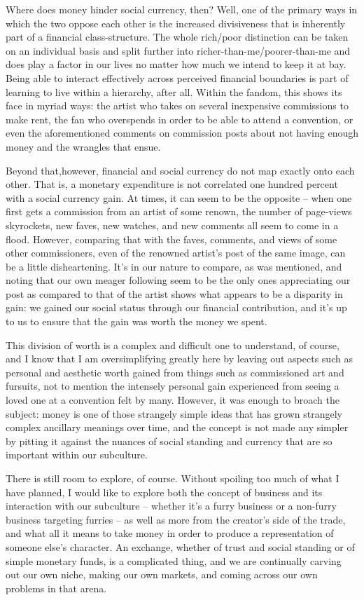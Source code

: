 Where does money hinder social currency, then?  Well, one of the primary ways in which the two oppose each other is the increased divisiveness that is inherently part of a financial class-structure.  The whole rich/poor distinction can be taken on an individual basis and split further into richer-than-me/poorer-than-me and does play a factor in our lives no matter how much we intend to keep it at bay.  Being able to interact effectively across perceived financial boundaries is part of learning to live within a hierarchy, after all. Within the fandom, this shows its face in myriad ways: the artist who takes on several inexpensive commissions to make rent, the fan who overspends in order to be able to attend a convention, or even the aforementioned comments on commission posts about not having enough money and the wrangles that ensue.

Beyond that,however, financial and social currency do not map exactly onto each other.  That is, a monetary expenditure is not correlated one hundred percent with a social currency gain.  At times, it can seem to be the opposite -- when one first gets a commission from an artist of some renown, the number of page-views skyrockets, new faves, new watches, and new comments all seem to come in a flood.  However, comparing that with the faves, comments, and views of some other commissioners, even of the renowned artist's post of the same image, can be a little disheartening.  It's in our nature to compare, as was mentioned, and noting that our own meager following seem to be the only ones appreciating our post as compared to that of the artist shows what appears to be a disparity in gain: we gained our social status through our financial contribution, and it's up to us to ensure that the gain was worth the money we spent.

This division of worth is a complex and difficult one to understand, of course, and I know that I am oversimplifying greatly here by leaving out aspects such as personal and aesthetic worth gained from things such as commissioned art and fursuits, not to mention the intensely personal gain experienced from seeing a loved one at a convention felt by many.  However, it was enough to broach the subject: money is one of those strangely simple ideas that has grown strangely complex ancillary meanings over time, and the concept is not made any simpler by pitting it against the nuances of social standing and currency that are so important within our subculture.

There is still room to explore, of course.  Without spoiling too much of what I have planned, I would like to explore both the concept of business and its interaction with our subculture -- whether it's a furry business or a non-furry business targeting furries -- as well as more from the creator's side of the trade, and what all it means to take money in order to produce a representation of someone else's character.  An exchange, whether of trust and social standing or of simple monetary funds, is a complicated thing, and we are continually carving out our own niche, making our own markets, and coming across our own problems in that arena.
